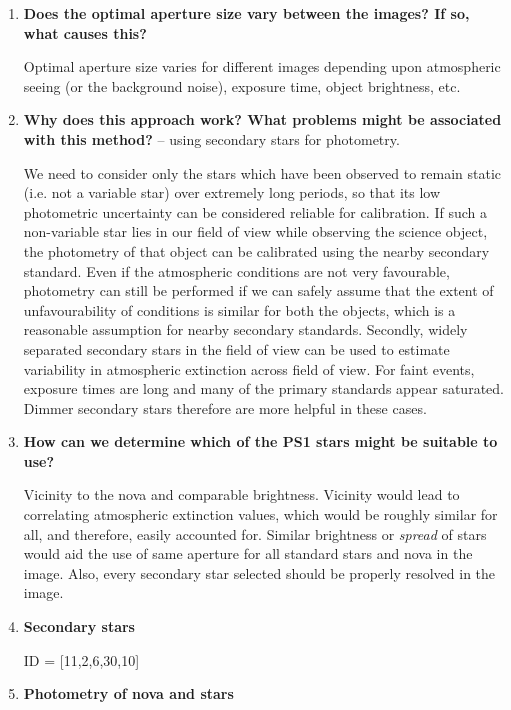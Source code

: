 \documentclass{article}
\begin{document}
\begin{enumerate}
		\item \textbf{Does the optimal aperture size vary between the images? If so, what causes this?}
		
		Optimal aperture size varies for different images depending upon atmospheric seeing (or the background noise), exposure time, object brightness, etc.
		
		\item \textbf{Why does this approach work?
What problems might be associated with this method?} -- using secondary stars for photometry.
		
		We need to consider only the stars which have been observed to remain static (i.e. not a variable star) over extremely long periods, so that its low photometric uncertainty can be considered reliable for calibration. If such a non-variable star lies in our field of view while observing the science object, the photometry of that object can be calibrated using the nearby secondary standard. Even if the atmospheric conditions are not very favourable, photometry can still be performed if we can safely assume that the extent of unfavourability of conditions is similar for both the objects, which is a reasonable assumption for nearby secondary standards. Secondly, widely separated secondary stars in the field of view can be used to estimate variability in atmospheric extinction across field of view. For faint events, exposure times are long and many of the primary standards appear saturated. Dimmer secondary stars therefore are more helpful in these cases.
		
		 \item \textbf{How can we determine which of the PS1 stars might be suitable to use?}
		
		Vicinity to the nova and comparable brightness. Vicinity would lead to correlating atmospheric extinction values, which would be roughly similar for all, and therefore, easily accounted for. Similar brightness or \emph{spread} of stars would aid the use of same aperture for all standard stars and nova in the image. Also, every secondary star selected should be properly resolved in the image.
		
		\item \textbf{Secondary stars}
		
		ID = [11,2,6,30,10]
		
		\item \textbf{Photometry of nova and stars}
		

\end{enumerate}
\end{document}

